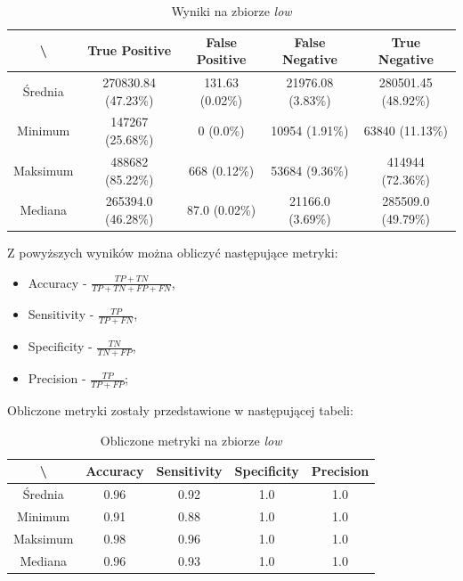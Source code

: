 \begin{table}[!h]
	\centering
	\caption{Wyniki na zbiorze \textit{low}}
	\vspace{6pt}
	{\footnotesize
		\begin{tabular}{|c|c|c|c|c|}
			\hline \textbackslash & True Positive & False Positive & False Negative & True Negative \\
      \hline Średnia & 270830.84 (47.23\%) & 131.63 (0.02\%) & 21976.08 (3.83\%) & 280501.45 (48.92\%) \\
      \hline Minimum & 147267 (25.68\%) & 0 (0.0\%) & 10954 (1.91\%) & 63840 (11.13\%) \\
      \hline Maksimum & 488682 (85.22\%) & 668 (0.12\%) & 53684 (9.36\%) & 414944 (72.36\%) \\
      \hline Mediana & 265394.0 (46.28\%) & 87.0 (0.02\%) & 21166.0 (3.69\%) & 285509.0 (49.79\%) \\
      \hline
		\end{tabular}
	}
	\vspace{0pt}
\end{table}

\vspace{1cm}

Z powyższych wyników można obliczyć następujące metryki:

\begin{itemize}
  \item Accuracy - $ \frac{TP + TN}{TP + TN + FP + FN} $,
  \item Sensitivity - $ \frac{TP}{TP + FN} $,
  \item Specificity - $ \frac{TN}{TN + FP} $,
  \item Precision - $ \frac{TP}{TP + FP} $;
\end{itemize}

Obliczone metryki zostały przedstawione w następującej tabeli:

\begin{table}[!h]
	\centering
	\caption{Obliczone metryki na zbiorze \textit{low}}
	\vspace{6pt}
	{\footnotesize
		\begin{tabular}{|c|c|c|c|c|}
			\hline \textbackslash & Accuracy & Sensitivity & Specificity & Precision \\
      \hline Średnia & 0.96 & 0.92 & 1.0 & 1.0 \\
      \hline Minimum & 0.91 & 0.88 & 1.0 & 1.0 \\
      \hline Maksimum & 0.98 & 0.96 & 1.0 & 1.0 \\
      \hline Mediana & 0.96 & 0.93 & 1.0 & 1.0 \\
      \hline
		\end{tabular}
	}
	\vspace{0pt}
\end{table}
